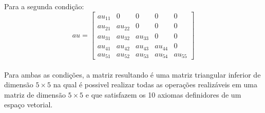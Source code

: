 Para a segunda condição:
\\
\[
    au =
    \begin{bmatrix}
        au_{11} & 0       & 0       & 0       & 0       \\
        au_{21} & au_{22} & 0       & 0       & 0       \\
        au_{31} & au_{32} & au_{33} & 0       & 0       \\
        au_{41} & au_{42} & au_{43} & au_{44} & 0       \\
        au_{51} & au_{52} & au_{53} & au_{54} & au_{55}
    \end{bmatrix}
\]
\\

Para ambas as condições, a matriz resultando é uma matriz triangular inferior de dimensão $5\times 5$ na qual é possivel realizar todas as operações realizáveis em uma matriz de dimensão $5\times 5$ e que satisfazem os 10 axiomas definidores de um espaço vetorial.
\\